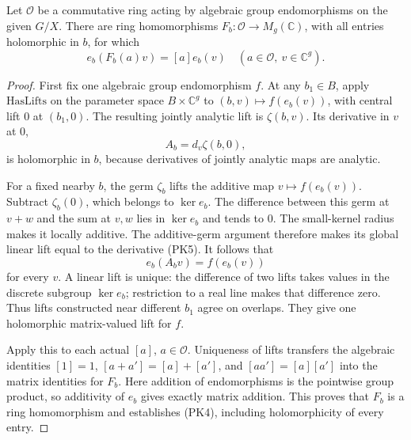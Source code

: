 \begin{srlemma}
\label{lem:ftb-holomorphic-coefficient-action}
Let \(\mathcal O\) be a commutative ring acting by
algebraic group endomorphisms on the given \(G/X\).
There are ring homomorphisms
\(F_b:\mathcal O\to M_g(\mathbb C)\), with all entries
holomorphic in \(b\), for which
\[
              e_b(F_b(a)v)=[a]e_b(v)
                       \quad(a\in\mathcal O,\ v\in\mathbb C^g).
                                                               \tag{PK4}
\]
\end{srlemma}
\begin{proof}
First fix one algebraic group endomorphism \(f\).
At any \(b_1\in B\), apply \(\mathrm{HasLifts}\) on
the parameter space \(B\times\mathbb C^g\) to
\((b,v)\mapsto f(e_b(v))\), with central lift \(0\)
at \((b_1,0)\).
The resulting jointly analytic lift is \(\zeta(b,v)\).
Its derivative in \(v\) at \(0\),
\[
                              A_b=d_v\zeta(b,0),            \tag{PK5}
\]
is holomorphic in \(b\), because derivatives of jointly
analytic maps are analytic.

For a fixed nearby \(b\), the germ \(\zeta_b\) lifts the
additive map \(v\mapsto f(e_b(v))\).
Subtract \(\zeta_b(0)\), which belongs to \(\ker e_b\).
The difference between this germ at \(v+w\) and the sum
at \(v,w\) lies in \(\ker e_b\) and tends to \(0\).
The small-kernel radius makes it locally additive.
The additive-germ argument therefore makes its global
linear lift equal to the derivative (PK5).
It follows that
\[
                                  e_b(A_bv)=f(e_b(v))
\]
for every \(v\).
A linear lift is unique: the difference of two lifts
takes values in the discrete subgroup \(\ker e_b\);
restriction to a real line makes that difference zero.
Thus lifts constructed near different \(b_1\) agree
on overlaps.
They give one holomorphic matrix-valued lift for \(f\).

Apply this to each actual \([a]\), \(a\in\mathcal O\).
Uniqueness of lifts transfers the algebraic identities
\([1]=1\), \([a+a']=[a]+[a']\), and
\([aa']=[a][a']\) into the matrix identities for
\(F_b\).
Here addition of endomorphisms is the pointwise group
product, so additivity of \(e_b\) gives exactly matrix
addition.
This proves that \(F_b\) is a ring homomorphism and
establishes (PK4), including holomorphicity of every entry.
\end{proof}

